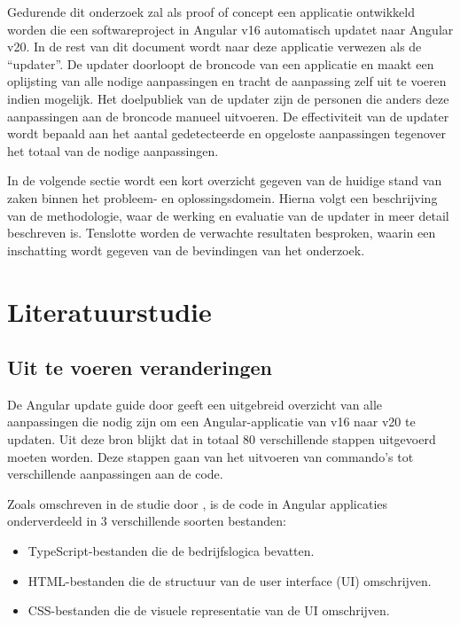 Gedurende dit onderzoek zal als proof of concept een applicatie ontwikkeld worden die een softwareproject in Angular v16 automatisch updatet naar Angular v20.
In de rest van dit document wordt naar deze applicatie verwezen als de ``updater''.
De updater doorloopt de broncode van een applicatie en maakt een oplijsting van alle nodige aanpassingen en tracht de aanpassing zelf uit te voeren indien mogelijk.
Het doelpubliek van de updater zijn de personen die anders deze aanpassingen aan de broncode manueel uitvoeren.
De effectiviteit van de updater wordt bepaald aan het aantal gedetecteerde en opgeloste aanpassingen tegenover het totaal van de nodige aanpassingen.

In de volgende sectie wordt een kort overzicht gegeven van de huidige stand van zaken binnen het probleem- en oplossingsdomein.
Hierna volgt een beschrijving van de methodologie, waar de werking en evaluatie van de updater in meer detail beschreven is.
Tenslotte worden de verwachte resultaten besproken, waarin een inschatting wordt gegeven van de bevindingen van het onderzoek.

\section{Literatuurstudie}
\label{sec:literatuurstudie}

\subsection{Uit te voeren veranderingen}

De Angular update guide door \textcite{AngularUpdateGuide2025} geeft een uitgebreid overzicht van alle aanpassingen die nodig zijn om een Angular-applicatie van v16 naar v20 te updaten. 
Uit deze bron blijkt dat in totaal 80 verschillende stappen uitgevoerd moeten worden.
Deze stappen gaan van het uitvoeren van commando's tot verschillende aanpassingen aan de code.

Zoals omschreven in de studie door \textcite{Cincovic2020}, is de code in Angular applicaties onderverdeeld in 3 verschillende soorten bestanden:
\begin{itemize}
  \item TypeScript-bestanden die de bedrijfslogica bevatten.
  \item HTML-bestanden die de structuur van de user interface (UI) omschrijven.
  \item CSS-bestanden die de visuele representatie van de UI omschrijven.
\end{itemize}

